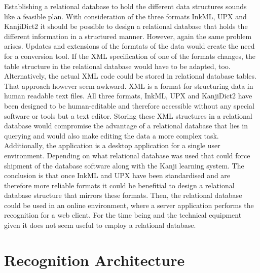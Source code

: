 Establishing a relational database to hold the different data structures 
sounds like a feasible plan. With consideration of the three formats
InkML, UPX and KanjiDict2 it should be possible to design a relational database
that holds the different information in a structured manner.
However, again the same problem arises. Updates and extensions of the formtats
of the data would create the need for a conversion tool.
If the XML specification of one of the formats changes, the table structure
in the relational database would have to be adapted, too.
Alternatively, the actual XML code could be stored in relational database 
tables. That approach however seem awkward. XML is a format for structuring
data in human readable text files. All three formats, InkML, UPX and KanjiDict2
have been designed to be human-editable and therefore accessible without
any special software or tools but a text editor.
Storing these XML structures in a relational database would compromise the 
advantage of a relational database that lies in querying and would also
make editing the data a more complex task.
Additionally, the application is a desktop application for a single user 
environment. Depending on what relational database was used that could
force shipment of the database software along with the Kanji learning system.
The conclusion is that once InkML and UPX have been standardised and are
therefore more reliable formats it could be benefitial to design a relational
database structure that mirrors these formats.
Then, the relational database could be used in an online environment, 
where a server application performs the recognition for a web client.
For the time being and the technical equipment given it does not seem
useful to employ a relational database.

\section{Recognition Architecture}
\label{sec:hwre:recognitionarchitecture}



